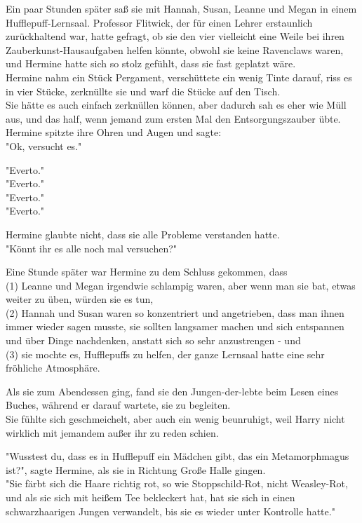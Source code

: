 {Ein paar Stunden später saß sie mit Hannah, Susan, Leanne und Megan in einem Hufflepuff-Lernsaal. Professor Flitwick, der für einen Lehrer erstaunlich zurückhaltend war, hatte gefragt, ob sie den vier vielleicht eine Weile bei ihren Zauberkunst-Hausaufgaben helfen könnte, obwohl sie keine Ravenclaws waren, und Hermine hatte sich so stolz gefühlt, dass sie fast geplatzt wäre.\\ Hermine nahm ein Stück Pergament, verschüttete ein wenig Tinte darauf, riss es in vier Stücke, zerknüllte sie und warf die Stücke auf den Tisch.\\ Sie hätte es auch einfach zerknüllen können, aber dadurch sah es eher wie Müll aus, und das half, wenn jemand zum ersten Mal den Entsorgungszauber übte.\\ Hermine spitzte ihre Ohren und Augen und sagte:\\ "Ok, versucht es."

"Everto."\\ "Everto."\\ "Everto."\\ "Everto."

Hermine glaubte nicht, dass sie alle Probleme verstanden hatte.\\ "Könnt ihr es alle noch mal versuchen?"

Eine Stunde später war Hermine zu dem Schluss gekommen, dass\\ (1) Leanne und Megan irgendwie schlampig waren, aber wenn man sie bat, etwas weiter zu üben, würden sie es tun,\\ (2) Hannah und Susan waren so konzentriert und angetrieben, dass man ihnen immer wieder sagen musste, sie sollten langsamer machen und sich entspannen und über Dinge nachdenken, anstatt sich so sehr anzustrengen - und\\ (3) sie mochte es, Hufflepuffs zu helfen, der ganze Lernsaal hatte eine sehr fröhliche Atmosphäre.

Als sie zum Abendessen ging, fand sie den Jungen-der-lebte beim Lesen eines Buches, während er darauf wartete, sie zu begleiten.\\ Sie fühlte sich geschmeichelt, aber auch ein wenig beunruhigt, weil Harry nicht wirklich mit jemandem außer ihr zu reden schien.

"Wusstest du, dass es in Hufflepuff ein Mädchen gibt, das ein Metamorphmagus ist?", sagte Hermine, als sie in Richtung Große Halle gingen.\\ "Sie färbt sich die Haare richtig rot, so wie Stoppschild-Rot, nicht Weasley-Rot, und als sie sich mit heißem Tee bekleckert hat, hat sie sich in einen schwarzhaarigen Jungen verwandelt, bis sie es wieder unter Kontrolle hatte."

}
